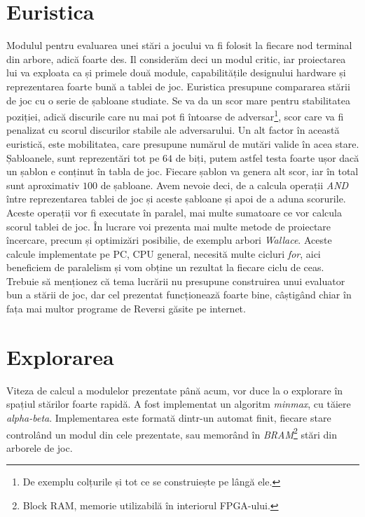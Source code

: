 \documentclass[11pt,twocolumn,a4paper]{article}
\begin{document}
\section*{Euristica}
Modulul pentru evaluarea unei stări a jocului va fi folosit la fiecare nod terminal din arbore, adică foarte des. Il considerăm deci un modul critic, iar proiectarea lui va exploata ca și primele două module, capabilitățile designului hardware și reprezentarea foarte bună a tablei de joc. Euristica presupune compararea stării de joc cu o serie de șabloane studiate\cite{Fang}\cite{Buro}\cite{Buro2}. Se va da un scor mare pentru stabilitatea poziției, adică discurile care nu mai pot fi întoarse de adversar\footnote{De exemplu colțurile și tot ce se construiește pe lângă ele.}, scor care va fi penalizat cu scorul discurilor stabile ale adversarului. Un alt factor în această euristică, este mobilitatea\cite{Fang}\cite{Buro2}, care presupune numărul de mutări valide în acea stare. Șabloanele, sunt reprezentări tot pe $64$ de biți, putem astfel testa foarte ușor dacă un șablon e conținut în tabla de joc. Fiecare șablon va genera alt scor, iar în total sunt aproximativ $100$ de șabloane. Avem nevoie deci, de a calcula operații \emph{AND} între reprezentarea tablei de joc și aceste șabloane și apoi de a aduna scorurile. Aceste operații vor fi executate în paralel, mai multe sumatoare ce vor calcula scorul tablei de joc. În lucrare voi prezenta mai multe metode de proiectare încercare, precum și optimizări posibilie, de exemplu arbori \emph{Wallace}\cite{Cormen}\cite{Enoch}\cite{Vojin}\cite{Kai}. Aceste calcule implementate pe PC, CPU general, necesită multe cicluri \emph{for}, aici beneficiem de paralelism și vom obține un rezultat la fiecare ciclu de ceas. Trebuie să menționez că tema lucrării nu presupune construirea unui evaluator bun a stării de joc, dar cel prezentat funcționează foarte bine, câștigând chiar în fața mai multor programe de Reversi găsite pe internet.
\section*{Explorarea}
Viteza de calcul a modulelor prezentate până acum, vor duce la o explorare în spațiul stărilor foarte rapidă. A fost implementat un algoritm \emph{minmax}, cu tăiere \emph{alpha-beta}. Implementarea este formată dintr-un automat finit, fiecare stare controlând un modul din cele prezentate, sau memorând în \emph{BRAM}\footnote{Block RAM, memorie utilizabilă în interiorul FPGA-ului.} stări din arborele de joc.\cite{xst}
\end{document}
